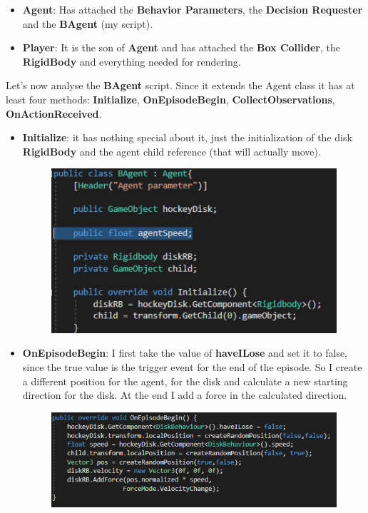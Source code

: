 \documentclass[12pt]{article}
\begin{document}
	\begin{itemize}
		\item \textbf{Agent}: Has attached the \textbf{Behavior Parameters}, the \textbf{Decision Requester} and the \textbf{BAgent} (my script).
		\item \textbf{Player}: It is the son of \textbf{Agent} and has attached the \textbf{Box Collider}, the \textbf{RigidBody} and everything needed for rendering.
	\end{itemize}
	
	\noindent
	Let's now analyse the \textbf{BAgent} script. Since it extends the Agent class it has at least four methods: \textbf{Initialize}, \textbf{OnEpisodeBegin},\textbf{ CollectObservations},\textbf{ OnActionReceived}.\\
	
	\begin{itemize}
		\item \textbf{Initialize}: it has nothing special about it, just the initialization of the disk \textbf{RigidBody} and the agent child reference (that will actually move).	
		
		\begin{figure}[hbt!]
			\centering
			\includegraphics[width= 0.8
			\textwidth]{images/Initialize.png}
		\end{figure} 
	
		\item \textbf{OnEpisodeBegin}: I first take the value of \textbf{haveILose} and set it to false, since the true value is the trigger event for the end of the episode. So I create a different position for the agent, for the disk and calculate a new starting direction for the disk. At the end I add a force in the calculated direction.
		
		\newpage
		
		\begin{figure}[hbt!]
			\centering
			\includegraphics[width= 1
			\textwidth]{images/OnEpisodeBegin.png}
		\end{figure} 
	

\end{itemize}
\end{document}
